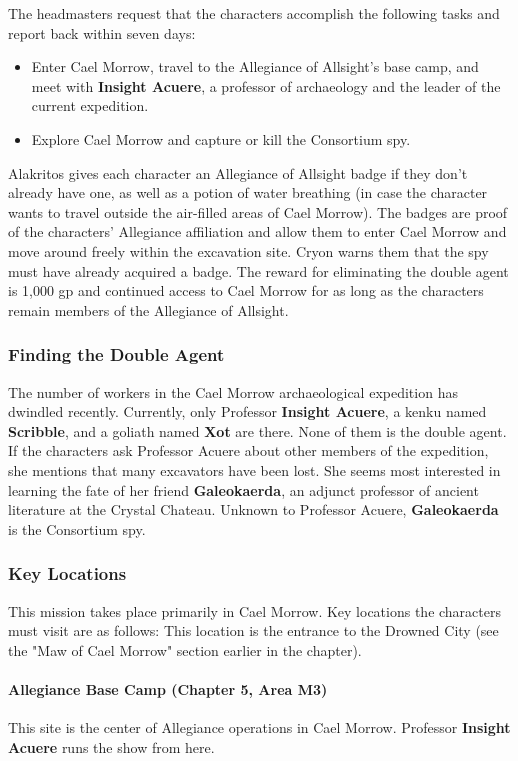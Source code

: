 \documentclass[10pt,a4,twoside,twocolumn,openany,nodeprecatedcode]{dndbook}
\begin{document}
The headmasters request that the characters accomplish the following tasks and report back within seven days:
\begin{itemize}

\item Enter Cael Morrow, travel to the Allegiance of Allsight's base camp, and meet with \textbf{Insight Acuere}, a professor of archaeology and the leader of the current expedition.
\item Explore Cael Morrow and capture or kill the Consortium spy.
\end{itemize}


Alakritos gives each character an Allegiance of Allsight badge if they don't already have one, as well as a potion of water breathing (in case the character wants to travel outside the air-filled areas of Cael Morrow). The badges are proof of the characters' Allegiance affiliation and allow them to enter Cael Morrow and move around freely within the excavation site. Cryon warns them that the spy must have already acquired a badge.
The reward for eliminating the double agent is 1,000 gp and continued access to Cael Morrow for as long as the characters remain members of the Allegiance of Allsight.
\subsubsection{Finding the Double Agent}
The number of workers in the Cael Morrow archaeological expedition has dwindled recently. Currently, only Professor \textbf{Insight Acuere}, a kenku named \textbf{Scribble}, and a goliath named \textbf{Xot} are there. None of them is the double agent.
If the characters ask Professor Acuere about other members of the expedition, she mentions that many excavators have been lost. She seems most interested in learning the fate of her friend \textbf{Galeokaerda}, an adjunct professor of ancient literature at the Crystal Chateau. Unknown to Professor Acuere, \textbf{Galeokaerda} is the Consortium spy.
\subsubsection{Key Locations}
This mission takes place primarily in Cael Morrow. Key locations the characters must visit are as follows:
{{This location is the entrance to the Drowned City (see the "Maw of Cael Morrow" section earlier in the chapter).}}
\paragraph{Allegiance Base Camp (Chapter 5, Area M3)}
This site is the center of Allegiance operations in Cael Morrow. Professor \textbf{Insight Acuere} runs the show from here.
\end{document}
